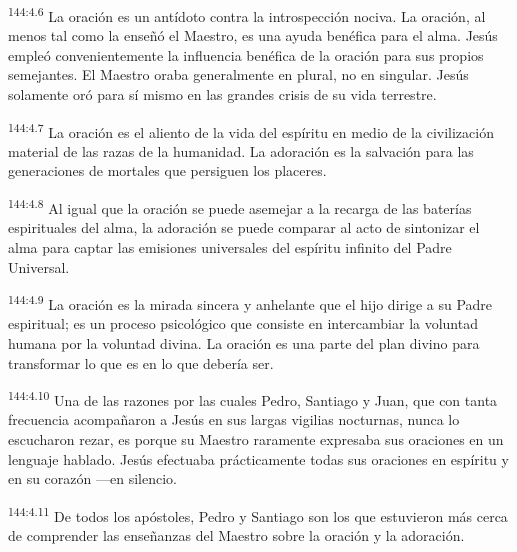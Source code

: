 \par
\textsuperscript{144:4.6} La oración es un antídoto contra la introspección nociva. La oración, al menos tal como la enseñó el Maestro, es una ayuda benéfica para el alma. Jesús empleó convenientemente la influencia benéfica de la oración para sus propios semejantes. El Maestro oraba generalmente en plural, no en singular. Jesús solamente oró para sí mismo en las grandes crisis de su vida terrestre.

\par
\textsuperscript{144:4.7} La oración es el aliento de la vida del espíritu en medio de la civilización material de las razas de la humanidad. La adoración es la salvación para las generaciones de mortales que persiguen los placeres.

\par
\textsuperscript{144:4.8} Al igual que la oración se puede asemejar a la recarga de las baterías espirituales del alma, la adoración se puede comparar al acto de sintonizar el alma para captar las emisiones universales del espíritu infinito del Padre Universal.

\par
\textsuperscript{144:4.9} La oración es la mirada sincera y anhelante que el hijo dirige a su Padre espiritual; es un proceso psicológico que consiste en intercambiar la voluntad humana por la voluntad divina. La oración es una parte del plan divino para transformar lo que es en lo que debería ser.

\par
\textsuperscript{144:4.10} Una de las razones por las cuales Pedro, Santiago y Juan, que con tanta frecuencia acompañaron a Jesús en sus largas vigilias nocturnas, nunca lo escucharon rezar, es porque su Maestro raramente expresaba sus oraciones en un lenguaje hablado. Jesús efectuaba prácticamente todas sus oraciones en espíritu y en su corazón ---en silencio.

\par
\textsuperscript{144:4.11} De todos los apóstoles, Pedro y Santiago son los que estuvieron más cerca de comprender las enseñanzas del Maestro sobre la oración y la adoración.

